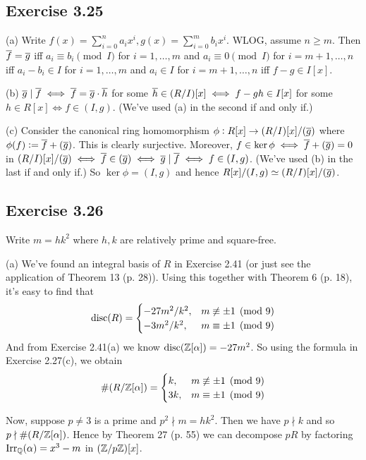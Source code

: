 \documentclass[../Marcus.tex]{subfiles}
\begin{document}
\subsection*{Exercise 3.25}

(a) Write $f(x)=\sum_{i=0}^n a_ix^i,g(x)=\sum_{i=0}^m b_ix^i$. WLOG, assume $n\geq m$. Then $\overline{f}=\overline{g}$ iff $a_i\equiv b_i\pmod{I}$ for $i=1,\ldots,m$ and $a_i\equiv 0\pmod{I}$ for $i=m+1,\ldots,n$ iff $a_i-b_i\in I$ for $i=1,\ldots,m$ and $a_i\in I$ for $i=m+1,\ldots,n$ iff $f-g\in I[x]$.

(b) $\overline{g}\mid\overline{f} \iff \overline{f}=\overline{g}\cdot\overline{h}$ for some $\overline{h}\in (R/I)[x] \iff f-gh\in I[x]$ for some $h\in R[x] \iff f\in(I,g)$. (We've used (a) in the second if and only if.)

(c) Consider the canonical ring homomorphism $\phi:R[x]\to(R/I)[x]/(\overline{g})$ where $\phi(f):=\overline{f}+(\overline{g})$. This is clearly surjective. Moreover, $f\in\ker\phi \iff \overline{f}+(\overline{g})=0$ in $(R/I)[x]/(\overline{g}) \iff \overline{f}\in(\overline{g}) \iff \overline{g}\mid\overline{f} \iff f\in(I,g)$. (We've used (b) in the last if and only if.) So $\ker\phi=(I,g)$ and hence $R[x]/(I,g)\simeq (R/I)[x]/(\overline{g})$.

\subsection*{Exercise 3.26}

Write $m=hk^2$ where $h,k$ are relatively prime and square-free.

(a) We've found an integral basis of $R$ in Exercise 2.41 (or just see the application of Theorem 13 (p. 28)). Using this together with Theorem 6 (p. 18), it's easy to find that
$$
\operatorname{disc}(R) =
\begin{cases}
-27m^2/k^2, & m\not\equiv \pm1 \pmod{9} \\
-3m^2/k^2, & m\equiv \pm1 \pmod{9}
\end{cases}
$$
And from Exercise 2.41(a) we know $\operatorname{disc}(\mathbb{Z}[\alpha])=-27m^2$. So using the formula in Exercise 2.27(c), we obtain
$$
\#(R/\mathbb{Z}[\alpha]) =
\begin{cases}
k, & m\not\equiv \pm1 \pmod{9} \\
3k, & m\equiv \pm1 \pmod{9}
\end{cases}
$$

Now, suppose $p\neq 3$ is a prime and $p^2\nmid m=hk^2$. Then we have $p\nmid k$ and so $p\nmid \#(R/\mathbb{Z}[\alpha])$. Hence by Theorem 27 (p. 55) we can decompose $pR$ by factoring $\operatorname{Irr}_{\mathbb{Q}}(\alpha)=x^3-m$ in $(\mathbb{Z}/p\mathbb{Z})[x]$.
\end{document}
